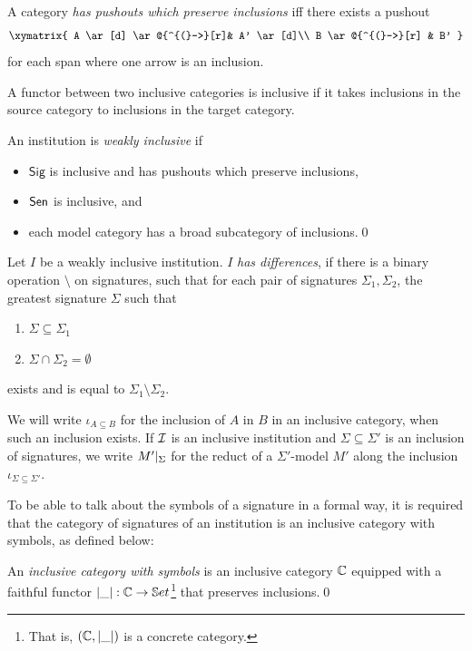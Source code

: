\documentclass[10pt, a4paper]{isov2}
\newcommand{\Sig}{\mathsf{Sig}}
\begin{document}
\noindent
A category \emph{has pushouts which preserve inclusions} iff 
there exists a pushout
%
\begin{equation*}
\xymatrix{
  A  \ar[d] \ar@{^{(}->}[r]& A' \ar[d]\\
  B \ar@{^{(}->}[r] & B'
}
\end{equation*}
%
for each span where one arrow is an inclusion.

A functor between two inclusive categories is inclusive if it takes inclusions in the source category to inclusions in the target category.

\begin{definition}
An institution is \emph{weakly inclusive} if
\begin{itemize}
  \item $\Sig$ is inclusive and has pushouts which preserve inclusions,
  \item $\mathsf{Sen}$ is inclusive, and
  \item each model category has a broad subcategory of inclusions.\quad\qed
\end{itemize}
\end{definition}

Let $I$ be a weakly inclusive institution.  $I$  \emph{has differences}, if there is a binary operation $\setminus$ on signatures, 
such that for each pair of signatures 
$\Sigma_1, \Sigma_2$, the greatest signature $\Sigma$ such that
\begin{enumerate}
  \item $\Sigma \subseteq \Sigma_1$
  \item $\Sigma \cap \Sigma_2 = \emptyset$
\end{enumerate} 
exists and is equal to $\Sigma_1\setminus \Sigma_2$.

We will write $\iota_{A\subseteq B}$ for the inclusion of $A$ in $B$ in an
inclusive category, when such an inclusion exists. If ${\cal I}$ is an inclusive institution
and $\Sigma\subseteq\Sigma'$ is an inclusion of signatures, we write 
$M'|_{\Sigma}$ for the reduct of a $\Sigma'$-model $M'$ along the inclusion
$\iota_{\Sigma\subseteq\Sigma'}$.

To be able to talk about the symbols of a signature in a formal way, it
is required that the category of signatures of an institution is an
inclusive category with symbols, as defined below:

\begin{definition}
An \emph{inclusive category with symbols} is an inclusive category
$\mathbb{C}$ equipped with a faithful functor $|\_|:\mathbb{C}\to\mathbb{S}et$\footnote{That is,
$(\mathbb{C},|\_|)$ is a concrete category.} that preserves
inclusions.\quad\qed
\end{definition}
\end{document}
